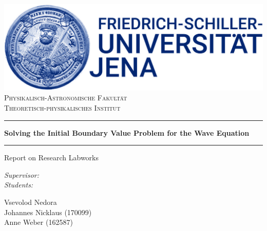 \documentclass[a4paper,headsepline,12pt,oneside]{scrartcl}
\begin{document}
\begin{titlepage}
  \thispagestyle{empty}
  \makeatletter
  \centering
  \includegraphics[scale = 0.2]{graphics/fsulogo.jpg}\\[1.0 cm]
  \textsc{\Large Physikalisch-Astronomische Fakultät\\Theoretisch-physikalisches Institut}
  \vspace{1cm} \hrule \vspace{0.4cm}
  \Large \textbf{Solving the Initial Boundary Value Problem for the Wave Equation}
  \vspace{0.4cm} \hrule \vspace{1cm}
  \Large Report on Research Labworks \\
  \vspace{1cm}
  {\centering
  }

  \begin{minipage}[t]{0.4\textwidth}
      \begin{flushright} \large
          \emph{Supervisor:}\\
          \emph{Students:}
       \end{flushright}
  \end{minipage}%
  \hspace{0.5cm}
  \begin{minipage}[t]{0.4\textwidth}
  \begin{flushleft} \large
        Vsevolod Nedora \\
        Johannes Nicklaus (170099) \\ Anne Weber (162587)
  \end{flushleft}
  \end{minipage}\\[2 cm]
  \makeatother
\end{titlepage}


\newpage
\setcounter{page}{0}
\tableofcontents
\clearpage
\setcounter{page}{1}
\end{document}
